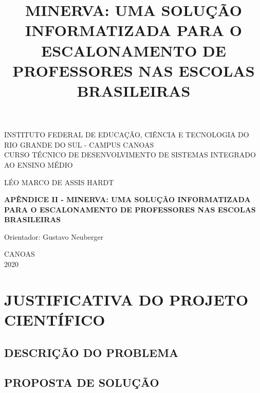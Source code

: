 \documentclass[12pt,a4paper]{article}
\title{MINERVA: UMA SOLUÇÃO INFORMATIZADA PARA O ESCALONAMENTO DE PROFESSORES NAS ESCOLAS BRASILEIRAS}
\newenvironment{bottompar}{\par\vspace*{\fill}}{\clearpage}
\begin{document}
	\thispagestyle{empty}

	\begin{center}
		INSTITUTO FEDERAL DE EDUCAÇÃO, CIÊNCIA E TECNOLOGIA DO RIO GRANDE DO SUL - CAMPUS CANOAS \\
		CURSO TÉCNICO DE DESENVOLVIMENTO DE SISTEMAS INTEGRADO AO ENSINO MÉDIO\\
	\end{center}

	\vskip 3cm

	\begin{center}
		LÉO MARCO DE ASSIS HARDT
	\end{center}

	\vskip 5cm

	\begin{center}
		\textbf{APÊNDICE II - MINERVA: UMA SOLUÇÃO INFORMATIZADA PARA O ESCALONAMENTO DE PROFESSORES NAS ESCOLAS BRASILEIRAS}
	\end{center}

	\vskip 5cm

	\begin{center}
		Orientador: Gustavo Neuberger
	\end{center}



	\begin{bottompar}
		\begin{center}
		CANOAS \\
		2020
		\end{center}
	\end{bottompar}

    \section{JUSTIFICATIVA DO PROJETO CIENTÍFICO}

		\lipsum[1]

		\subsection{DESCRIÇÃO DO PROBLEMA}

			\lipsum[1]

		\subsection{PROPOSTA DE SOLUÇÃO}
\end{document}

